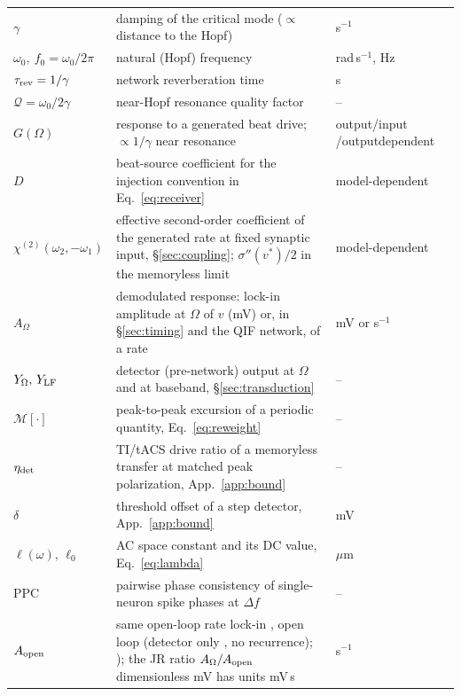 \documentclass[11pt,a4paper]{article}
\newcommand{\Sig}{\sigma}
\providecommand{\DIFaddtex}[1]{{\protect\color{blue} \sf #1}} %
\providecommand{\DIFdeltex}[1]{{\protect\color{red} \scriptsize #1}} %
\providecommand{\DIFaddbegin}{} %
\providecommand{\DIFaddend}{} %
\providecommand{\DIFdelbegin}{} %
\providecommand{\DIFdelend}{} %
\providecommand{\DIFadd}[1]{\texorpdfstring{\DIFaddtex{#1}}{#1}} %
\providecommand{\DIFdel}[1]{\texorpdfstring{\DIFdeltex{#1}}{}} %
\begin{document}
{\begin{longtable}{@{}>{\raggedright\arraybackslash}p{} >{\raggedright\arraybackslash}p{} >{\raggedright\arraybackslash}p{}@{}}
$\gamma$ & damping of the critical mode ($\propto$ distance to the Hopf) & s$^{-1}$ \\
$\omega_0,\ f_0\!=\!\omega_0/2\pi$ & natural (Hopf) frequency & rad\,s$^{-1}$, Hz \\
$\tau_{\rm rev}=1/\gamma$ & network reverberation time & s \\
$\mathcal{Q}=\omega_0/2\gamma$ & near-Hopf resonance quality factor & -- \\
$G(\Omega)$ & response to a generated beat drive; $\propto1/\gamma$ near resonance & \DIFaddbegin \DIFadd{output/}\DIFaddend input \DIFdelbegin \DIFdel{/output}\DIFdelend dependent \\
$D$ & beat-source coefficient for the injection convention in Eq.~\eqref{eq:receiver} & model-dependent \\
$\chi^{(2)}(\omega_2,-\omega_1)$ & effective second-order coefficient of the generated rate at fixed synaptic input, \S\ref{sec:coupling}; $\Sig''(v^*)/2$ in the memoryless limit & model-dependent \\
$A_\Omega$ & demodulated response: lock-in amplitude at $\Omega$ of $v$ (mV) or, in \S\ref{sec:timing} and the QIF network, of a rate & mV or s$^{-1}$ \\
$Y_\Omega,\,Y_{\rm LF}$ & detector (pre-network) output at $\Omega$ and at baseband, \S\ref{sec:transduction} & -- \\
$\mathcal{M}[\cdot]$ & peak-to-peak excursion of a periodic quantity, Eq.~\eqref{eq:reweight} & -- \\
$\eta_{\rm det}$ & TI/tACS drive ratio of a memoryless transfer at matched peak polarization, App.~\ref{app:bound} & -- \\
$\delta$ & threshold offset of a step detector, App.~\ref{app:bound} & mV \\
$\ell(\omega),\,\ell_0$ & AC space constant and its DC value, Eq.~\eqref{eq:lambda} & $\mu$m \\
PPC & pairwise phase consistency of single-neuron spike phases at $\Delta f$ \cite{vinck2010} & -- \\
$A_{\rm open}$ & \DIFdelbegin \DIFdel{same }\DIFdelend \DIFaddbegin \DIFadd{open-loop rate }\DIFaddend lock-in \DIFdelbegin \DIFdel{, open loop }\DIFdelend (detector only\DIFdelbegin \DIFdel{, no recurrence); }\DIFdelend \DIFaddbegin \DIFadd{); the JR ratio }\DIFaddend $A_\Omega/A_{\rm open}$ \DIFdelbegin \DIFdel{dimensionless }%
\DIFdel{mV}\DIFdelend \DIFaddbegin \DIFadd{has units mV\,s }& \DIFadd{s$^{-1}$ }\DIFaddend \\

\end{longtable}}
\end{document}
